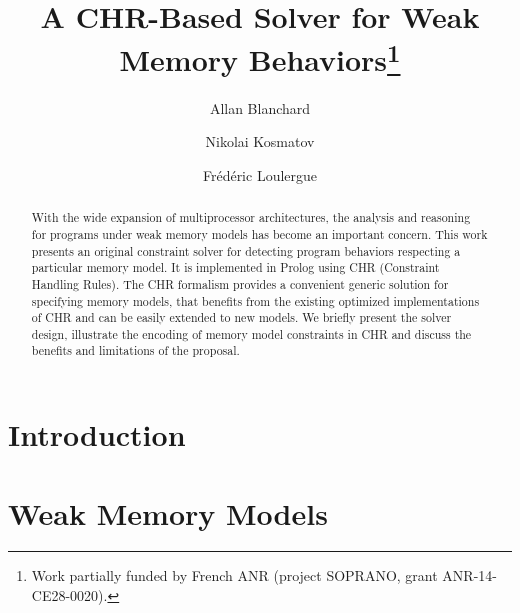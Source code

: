 \documentclass[EPiCempty]{easychair}
\title{A CHR-Based Solver for Weak Memory Behaviors\thanks{Work 
partially funded by French ANR (project SOPRANO, grant ANR-14-CE28-0020).}}
\author{
   Allan Blanchard\inst{1,2}
\and
   Nikolai Kosmatov\inst{1}
\and
   Frédéric Loulergue\inst{2}
}
\institute{
  CEA, LIST, Software Reliability Laboratory,
  PC 174, 91191 Gif-sur-Yvette France\\
  \email{firstname.lastname@cea.fr}
\and
  Univ Orléans, INSA Centre Val de Loire, LIFO EA 4022, Orléans, France%
}
\begin{document}
\maketitle

\begin{abstract}
  With the wide expansion of multiprocessor architectures, the
  analysis and reasoning for programs under weak memory models has
  become an important concern.  This work presents an original
  constraint solver for detecting program behaviors respecting a
  particular memory model.  It is implemented in Prolog using CHR
  (Constraint Handling Rules).  The CHR formalism provides a
  convenient generic solution for specifying memory models, that
  benefits from the existing optimized implementations of CHR and can
  be easily extended to new models.  We briefly present the solver
  design, illustrate the encoding of memory model constraints in CHR
  and discuss the benefits and limitations of the proposal.
\end{abstract}



%
%

\section{Introduction}
\label{sect:introduction}


\section{Weak Memory Models}
\label{sect:weakMemoryModels}

\end{document}
